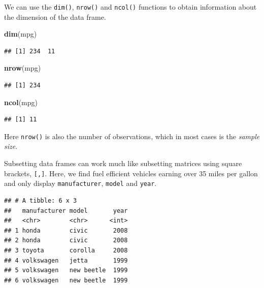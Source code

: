 \documentclass[]{book}
\newenvironment{Shaded}{\begin{snugshade}}{\end{snugshade}}
\newcommand{\KeywordTok}[1]{\textcolor[rgb]{0.13,0.29,0.53}{\textbf{#1}}}
\newcommand{\DecValTok}[1]{\textcolor[rgb]{0.00,0.00,0.81}{#1}}
\newcommand{\StringTok}[1]{\textcolor[rgb]{0.31,0.60,0.02}{#1}}
\newcommand{\OperatorTok}[1]{\textcolor[rgb]{0.81,0.36,0.00}{\textbf{#1}}}
\newcommand{\NormalTok}[1]{#1}
\theoremstyle{definition}
\theoremstyle{definition}
\theoremstyle{definition}
\theoremstyle{remark}
\begin{document}
We can use the \texttt{dim()}, \texttt{nrow()} and \texttt{ncol()}
functions to obtain information about the dimension of the data frame.

\begin{Shaded}
\begin{Highlighting}[]
\KeywordTok{dim}\NormalTok{(mpg)}
\end{Highlighting}
\end{Shaded}

\begin{verbatim}
## [1] 234  11
\end{verbatim}

\begin{Shaded}
\begin{Highlighting}[]
\KeywordTok{nrow}\NormalTok{(mpg)}
\end{Highlighting}
\end{Shaded}

\begin{verbatim}
## [1] 234
\end{verbatim}

\begin{Shaded}
\begin{Highlighting}[]
\KeywordTok{ncol}\NormalTok{(mpg)}
\end{Highlighting}
\end{Shaded}

\begin{verbatim}
## [1] 11
\end{verbatim}

Here \texttt{nrow()} is also the number of observations, which in most
cases is the \emph{sample size}.

Subsetting data frames can work much like subsetting matrices using
square brackets, \texttt{{[},{]}}. Here, we find fuel efficient vehicles
earning over 35 miles per gallon and only display \texttt{manufacturer},
\texttt{model} and \texttt{year}.

\begin{Shaded}
\end{Shaded}

\begin{verbatim}
## # A tibble: 6 x 3
##   manufacturer model       year
##   <chr>        <chr>      <int>
## 1 honda        civic       2008
## 2 honda        civic       2008
## 3 toyota       corolla     2008
## 4 volkswagen   jetta       1999
## 5 volkswagen   new beetle  1999
## 6 volkswagen   new beetle  1999
\end{verbatim}
\end{document}
